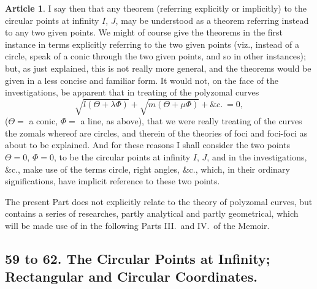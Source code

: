 \documentclass[11pt,a4paper]{article}
\theoremstyle{definition}
\newtheorem{art}{Article}
\begin{document}
\begin{art}
I say then that any theorem (referring explicitly or implicitly) to the circular points at infinity $I$, $J$, may be understood as a theorem referring instead to any two given points. We might of course give the theorems in the first instance in terms explicitly referring to the two given points (viz., instead of a circle, speak of a conic through the two given points, and so in other instances); but, as just explained, this is not really more general, and the theorems would be given in a less concise and familiar form. It would not, on the face of the investigations, be apparent that in treating of the polyzomal curves
\[
\sqrt{l(\Theta + \lambda\Phi)} + \sqrt{m(\Theta + \mu\Phi)} + \&c.\ = 0,
\]
($\Theta =$ a conic, $\Phi =$ a line, as above), that we were really treating of the curves the zomals whereof are circles, and therein of the theories of foci and foci-foci as about to be explained. And for these reasons I shall consider the two points $\Theta = 0$, $\Phi = 0$, to be the circular points at infinity $I$, $J$, and in the investigations, \&c., make use of the terms circle, right angles, \&c., which, in their ordinary significations, have implicit reference to these two points.

The present Part does not explicitly relate to the theory of polyzomal curves, but contains a series of researches, partly analytical and partly geometrical, which will be made use of in the following Parts III.\ and IV.\ of the Memoir.
\end{art}

\subsection{59 to 62. The Circular Points at Infinity; Rectangular and Circular Coordinates.}
\end{document}
